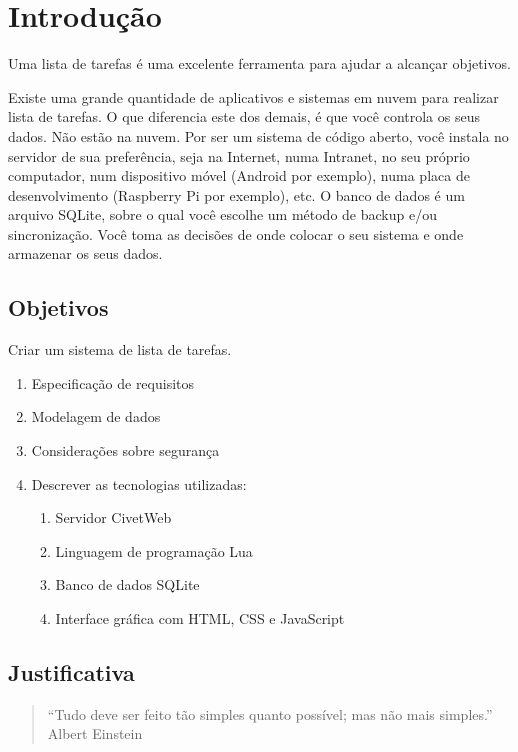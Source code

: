 
\chapter{Introdução}

Uma lista de tarefas é uma excelente ferramenta para ajudar a alcançar objetivos.

Existe uma grande quantidade de aplicativos e sistemas em nuvem para realizar lista de tarefas. O que diferencia este dos demais, é que você controla os seus dados. Não estão na nuvem. Por ser um sistema de código aberto, você instala no servidor de sua preferência, seja na Internet, numa Intranet, no seu próprio computador, num dispositivo móvel (Android por exemplo), numa placa de desenvolvimento (Raspberry Pi por exemplo), etc. O banco de dados é um arquivo SQLite, sobre o qual você escolhe um método de backup e/ou sincronização. Você toma as decisões de onde colocar o seu sistema e onde armazenar os seus dados.

\section{Objetivos}

Criar um sistema de lista de tarefas.

\begin{enumerate}
	\item Especificação de requisitos
	\item Modelagem de dados
	\item Considerações sobre segurança
	\item Descrever as tecnologias utilizadas:
	\begin{enumerate}
		\item Servidor CivetWeb
		\item Linguagem de programação Lua
		\item Banco de dados SQLite
		\item Interface gráfica com HTML, CSS e JavaScript
	\end{enumerate}
\end{enumerate}

\section{Justificativa}

\begin{quote}
``Tudo deve ser feito tão simples quanto possível; mas não mais simples.''
Albert Einstein
\end{quote}

